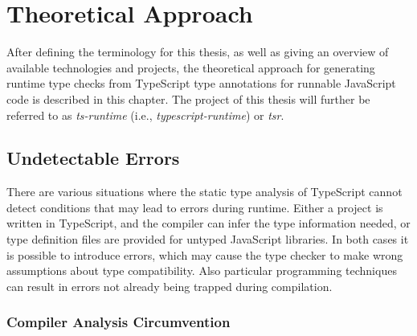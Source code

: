 \chapter{Theoretical Approach}
\label{cha:theoretical-approach}

After defining the terminology for this thesis, as well as giving an overview of available technologies and projects, the theoretical approach for generating runtime type checks from TypeScript type annotations for runnable JavaScript code is described in this chapter. The project of this thesis will further be referred to as \emph{ts-runtime} (i.e., \emph{typescript-runtime}) or \emph{tsr}.

\section{Undetectable Errors}
\label{sec:undetectable-errors}
%
%

There are various situations where the static type analysis of TypeScript cannot detect conditions that may lead to errors during runtime. Either a project is written in TypeScript, and the compiler can infer the type information needed, or type definition files are provided for untyped JavaScript libraries. In both cases it is possible to introduce errors, which may cause the type checker to make wrong assumptions about type compatibility. Also particular programming techniques can result in errors not already being trapped during compilation.

\subsection{Compiler Analysis Circumvention}


